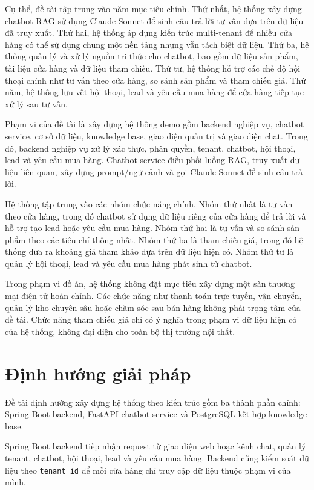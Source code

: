 \documentclass[../DoAn.tex]{subfiles}
\begin{document}
Cụ thể, đề tài tập trung vào năm mục tiêu chính. Thứ nhất, hệ thống xây dựng chatbot RAG sử dụng Claude Sonnet để sinh câu trả lời tư vấn dựa trên dữ liệu đã truy xuất. Thứ hai, hệ thống áp dụng kiến trúc multi-tenant để nhiều cửa hàng có thể sử dụng chung một nền tảng nhưng vẫn tách biệt dữ liệu. Thứ ba, hệ thống quản lý và xử lý nguồn tri thức cho chatbot, bao gồm dữ liệu sản phẩm, tài liệu cửa hàng và dữ liệu tham chiếu. Thứ tư, hệ thống hỗ trợ các chế độ hội thoại chính như tư vấn theo cửa hàng, so sánh sản phẩm và tham chiếu giá. Thứ năm, hệ thống lưu vết hội thoại, lead và yêu cầu mua hàng để cửa hàng tiếp tục xử lý sau tư vấn.

Phạm vi của đề tài là xây dựng hệ thống demo gồm backend nghiệp vụ, chatbot service, cơ sở dữ liệu, knowledge base, giao diện quản trị và giao diện chat. Trong đó, backend nghiệp vụ xử lý xác thực, phân quyền, tenant, chatbot, hội thoại, lead và yêu cầu mua hàng. Chatbot service điều phối luồng RAG, truy xuất dữ liệu liên quan, xây dựng prompt/ngữ cảnh và gọi Claude Sonnet để sinh câu trả lời.

Hệ thống tập trung vào các nhóm chức năng chính. Nhóm thứ nhất là tư vấn theo cửa hàng, trong đó chatbot sử dụng dữ liệu riêng của cửa hàng để trả lời và hỗ trợ tạo lead hoặc yêu cầu mua hàng. Nhóm thứ hai là tư vấn và so sánh sản phẩm theo các tiêu chí thống nhất. Nhóm thứ ba là tham chiếu giá, trong đó hệ thống đưa ra khoảng giá tham khảo dựa trên dữ liệu hiện có. Nhóm thứ tư là quản lý hội thoại, lead và yêu cầu mua hàng phát sinh từ chatbot.

Trong phạm vi đồ án, hệ thống không đặt mục tiêu xây dựng một sàn thương mại điện tử hoàn chỉnh. Các chức năng như thanh toán trực tuyến, vận chuyển, quản lý kho chuyên sâu hoặc chăm sóc sau bán hàng không phải trọng tâm của đề tài. Chức năng tham chiếu giá chỉ có ý nghĩa trong phạm vi dữ liệu hiện có của hệ thống, không đại diện cho toàn bộ thị trường nội thất.

\section{Định hướng giải pháp}
\label{section:1.3}

Đề tài định hướng xây dựng hệ thống theo kiến trúc gồm ba thành phần chính: Spring Boot backend, FastAPI chatbot service và PostgreSQL kết hợp knowledge base.

Spring Boot backend tiếp nhận request từ giao diện web hoặc kênh chat, quản lý tenant, chatbot, hội thoại, lead và yêu cầu mua hàng. Backend cũng kiểm soát dữ liệu theo \texttt{tenant\_id} để mỗi cửa hàng chỉ truy cập dữ liệu thuộc phạm vi của mình.
\end{document}
